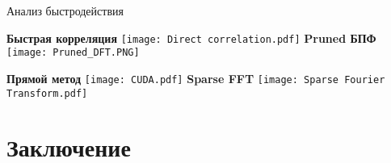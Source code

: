 \begin{frame}{Анализ быстродействия}
	\begin{minipage}[t]{0.43\linewidth}
	\centering 
	\textbf{Быстрая корреляция}
	\texttt{[image: Direct correlation.pdf]}
	\textbf{Pruned БПФ}
	\texttt{[image: Pruned\_DFT.PNG]}		
\end{minipage}
\hfill
\begin{minipage}[t]{0.43\linewidth}
	\centering 
	\textbf{Прямой метод}
	\texttt{[image: CUDA.pdf]}
	\textbf{Sparse FFT}
	\texttt{[image: Sparse Fourier Transform.pdf]}
\end{minipage}
\end{frame}



\section{Заключение}

